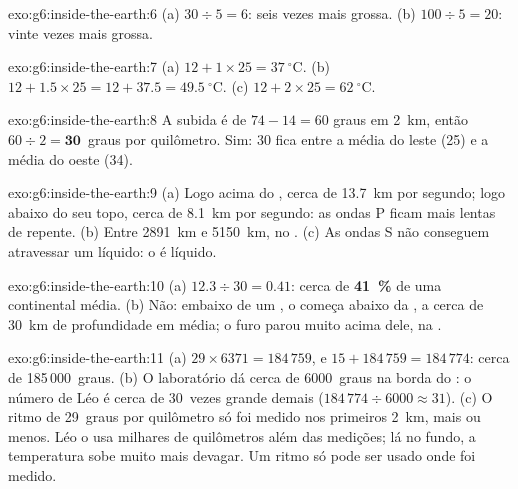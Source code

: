 \begin{solution}{exo:g6:inside-the-earth:6}
(a) $30 \div 5 = 6$: seis vezes mais grossa. (b) $100 \div 5 = 20$: vinte
vezes mais grossa.
\end{solution}

\begin{solution}{exo:g6:inside-the-earth:7}
(a) $12 + 1 \times 25 = 37~^\circ$C. (b) $12 + 1.5 \times 25 = 12 + 37.5 =
49.5~^\circ$C. (c) $12 + 2 \times 25 = 62~^\circ$C.
\end{solution}

\begin{solution}{exo:g6:inside-the-earth:8}
A subida é de $74 - 14 = 60$ graus em 2~km, então $60 \div 2 =
\textbf{30}$~graus por quilômetro. Sim: 30 fica entre a média do leste (25)
e a média do oeste (34).
\end{solution}

\begin{solution}{exo:g6:inside-the-earth:9}
(a) Logo acima do , cerca de 13.7~km por segundo; logo abaixo do seu
topo, cerca de 8.1~km por segundo: as ondas P ficam mais lentas de repente.
(b) Entre 2891~km e 5150~km, no . (c) As ondas S não
conseguem atravessar um líquido: o  é líquido.
\end{solution}

\begin{solution}{exo:g6:inside-the-earth:10}
(a) $12.3 \div 30 = 0.41$: cerca de \textbf{41~\%} de uma 
continental média. (b) Não: embaixo de um , o  começa
abaixo da , a cerca de 30~km de profundidade em média; o furo parou
muito acima dele, na .
\end{solution}

\begin{solution}{exo:g6:inside-the-earth:11}
(a) $29 \times 6371 = 184\,759$, e $15 + 184\,759 = 184\,774$: cerca de
185\,000~graus. (b) O laboratório dá cerca de 6000~graus na borda do : o número de Léo é cerca de 30~vezes grande demais
($184\,774 \div 6000 \approx 31$). (c) O ritmo de 29~graus por quilômetro
só foi medido nos primeiros 2~km, mais ou menos. Léo o usa milhares de
quilômetros além das medições; lá no fundo, a temperatura sobe muito mais
devagar. Um ritmo só pode ser usado onde foi medido.
\end{solution}

